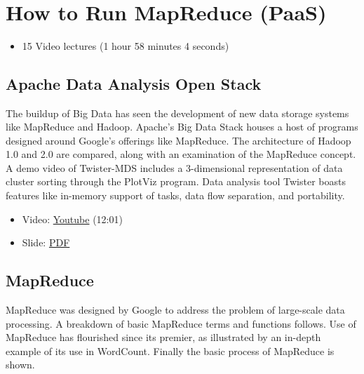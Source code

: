 \FILENAME\


\section{How to Run MapReduce (PaaS)}\label{how-to-run-mapreduce-paas}

\begin{itemize}

\item
  15 Video lectures (1 hour 58 minutes 4 seconds)
\end{itemize}

\subsection{Apache Data Analysis Open
Stack}\label{apache-data-analysis-open-stack}

The buildup of Big Data has seen the development of new data storage
systems like MapReduce and Hadoop. Apache's Big Data Stack houses a host
of programs designed around Google's offerings like MapReduce. The
architecture of Hadoop 1.0 and 2.0 are compared, along with an
examination of the MapReduce concept. A demo video of Twister-MDS
includes a 3-dimensional representation of data cluster sorting through
the PlotViz program. Data analysis tool Twister boasts features like
in-memory support of tasks, data flow separation, and portability.

\begin{itemize}

\item
  Video: \href{https://www.youtube.com/watch?v=6vkgvGtyv4Q}{Youtube}
  (12:01)
\end{itemize}

\begin{itemize}

\item
  Slide:
  \href{https://drive.google.com/open?id=0B88HKpainTSfMnpCelpNQUpNdVE}{PDF}
\end{itemize}

\subsection{MapReduce}\label{mapreduce}

MapReduce was designed by Google to address the problem of large-scale
data processing. A breakdown of basic MapReduce terms and functions
follows. Use of MapReduce has flourished since its premier, as
illustrated by an in-depth example of its use in WordCount. Finally the
basic process of MapReduce is shown.

